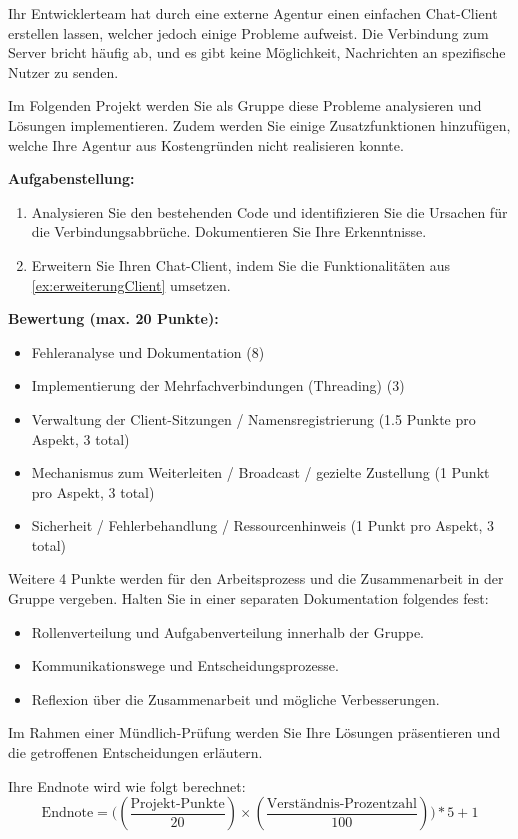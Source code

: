 \begin{myexercise}
    Ihr Entwicklerteam hat durch eine externe Agentur einen einfachen Chat-Client erstellen lassen, welcher jedoch einige Probleme aufweist. Die Verbindung zum Server bricht häufig ab, und es gibt keine Möglichkeit, Nachrichten an spezifische Nutzer zu senden.

    Im Folgenden Projekt werden Sie als Gruppe diese Probleme analysieren und Lösungen implementieren. Zudem werden Sie einige Zusatzfunktionen hinzufügen, welche Ihre Agentur aus Kostengründen nicht realisieren konnte.

    \textbf{Aufgabenstellung:}
    \begin{enumerate}
        \item Analysieren Sie den bestehenden Code und identifizieren Sie die Ursachen für die Verbindungsabbrüche. Dokumentieren Sie Ihre Erkenntnisse.
        \item Erweitern Sie Ihren Chat-Client, indem Sie die Funktionalitäten aus \cref{ex:erweiterungClient} umsetzen.
    \end{enumerate}

    \textbf{Bewertung (max. 20 Punkte):}
    \begin{itemize}
        \item Fehleranalyse und Dokumentation (8)
        \item Implementierung der Mehrfachverbindungen (Threading) (3)
        \item Verwaltung der Client-Sitzungen / Namensregistrierung (1.5 Punkte pro Aspekt, 3 total)
        \item Mechanismus zum Weiterleiten / Broadcast / gezielte Zustellung (1 Punkt pro Aspekt, 3 total)
        \item Sicherheit / Fehlerbehandlung / Ressourcenhinweis (1 Punkt pro Aspekt, 3 total)
    \end{itemize}

    Weitere 4 Punkte werden für den Arbeitsprozess und die Zusammenarbeit in der Gruppe vergeben. Halten Sie in einer separaten Dokumentation folgendes fest:
    \begin{itemize}
        \item Rollenverteilung und Aufgabenverteilung innerhalb der Gruppe.
        \item Kommunikationswege und Entscheidungsprozesse.
        \item Reflexion über die Zusammenarbeit und mögliche Verbesserungen.
    \end{itemize}

    Im Rahmen einer Mündlich-Prüfung werden Sie Ihre Lösungen präsentieren und die getroffenen Entscheidungen erläutern.

    Ihre Endnote wird wie folgt berechnet:
    \[\text{Endnote} = \Bigg(\left(\frac{\text{Projekt-Punkte}}{20}\right) \times \left(\frac{\text{Verständnis-Prozentzahl}}{100}\right)\Bigg)*5+1\]
\end{myexercise}

